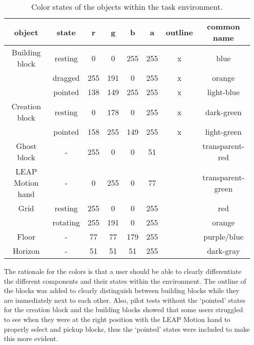 \begin{table}[H]
\centering
\begin{tabular}{|c|c|c|c|c|c|c|c|}
\hline
\textbf{object} & \textbf{state} & \textbf{r} & \textbf{g} & \textbf{b} & \textbf{a} & \textbf{outline} & \textbf{common name}\\ \hline\hline
Building block & resting & 0 & 0 & 255 & 255 & x & blue \\ 
 & dragged & 255 & 191 & 0 & 255 & x & orange \\ 
 & pointed & 138 & 149 & 255 & 255 & x & light-blue \\ \hline 
Creation block & resting & 0 & 178 & 0 & 255 & x & dark-green \\ 
 & pointed & 158 & 255 & 149 & 255 & x & light-green\\ \hline 
Ghost block & - & 255 & 0 & 0 & 51 & & transparent-red \\ \hline
LEAP Motion hand & - & 0 & 255 & 0 & 77 & & transparent-green  \\ \hline 
Grid & resting & 255 & 0 & 0 & 255 & & red \\ 
 & rotating & 255 & 191 & 0 & 255 & & orange \\ \hline 
Floor & - & 77 & 77 & 179 & 255 & & purple/blue \\ \hline 
Horizon & - & 51 & 51 & 51 & 255 & & dark-gray \\ \hline 
\end{tabular}
\caption{\label{tab:colors} Color states of the objects within the task environment.}
\end{table}

\noindent The rationale for the colors is that a user should be able to clearly differentiate the different components and their states within the environment. The outline of the blocks was added to clearly distinguish between building blocks while they are immediately next to each other. Also, pilot tests without the `pointed' states for the creation block and the building blocks showed that some users struggled to see when they were at the right position with the LEAP Motion hand to properly select and pickup blocks, thus the `pointed' states were included to make this more evident. 

